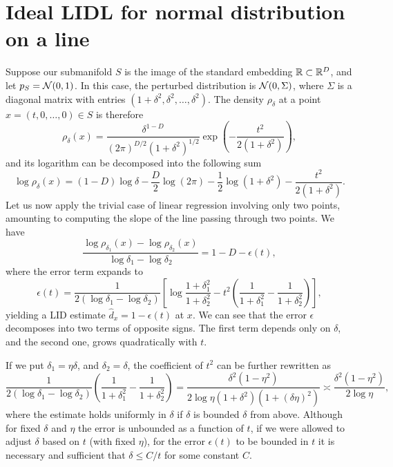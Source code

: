 \section{Ideal LIDL for normal distribution on a line}
\label{sec:appendix-lidl-for-normal-distribution}

Suppose our submanifold $S$ is the image of the standard embedding $\mathbb{R}\subset\mathbb{R}^D$, and let $p_S=\mathcal{N}(0,1)$. In this case, the perturbed distribution is $\mathcal{N}(0,\Sigma)$, where $\Sigma$ is a diagonal matrix with entries $(1+\delta^2, \delta^2, \dots, \delta^2)$. The density $\rho_\delta$ at a point $x=(t,0,\dots,0)\in S$ is therefore
\begin{equation}
    \rho_\delta(x) =  \frac{\delta^{1-D}}{(2\pi)^{D/2}(1+\delta^2)^{1/2}} \exp\left( -\frac{t^2}{2(1+\delta^2)}\right),
\end{equation}
and its logarithm can be decomposed into the following sum
\begin{equation}
    \log\rho_\delta(x) = 
        (1-D)\log\delta 
        - \frac{D}{2}\log(2\pi)
        - \frac{1}{2}\log(1+\delta^2)
        - \frac{t^2}{2(1+\delta^2)}.
\end{equation}
Let us now apply the trivial case of linear regression involving only two points, amounting to computing the slope of the line passing through two points. We have
\begin{equation}
    \frac{\log\rho_{\delta_1}(x) - \log\rho_{\delta_2}(x)}{\log\delta_1 - \log\delta_2} = 
        1 - D - \epsilon(t)
        ,
\end{equation}
where the error term expands to
\begin{equation}
    \epsilon(t)= \frac{1}{2(\log\delta_1 - \log\delta_2)}
            \left[ \log\frac{1+\delta_1^2}{1+\delta_2^2}
            - t^2 \left( \frac{1}{1+\delta_1^2} - \frac{1}{1+\delta_2^2} \right)\right],
\end{equation}
yielding a LID estimate $\hat{d}_x = 1 - \epsilon(t)$ at $x$.
We can see that the error $\epsilon$ decomposes into two terms of opposite signs. The first term depends only on $\delta$, and the second one, grows quadratically with $t$.

If we put $\delta_1=\eta\delta$, and $\delta_2=\delta$, the coefficient of $t^2$ can be further rewritten as
\begin{equation}
    \frac{1}{2(\log\delta_1 - \log\delta_2)} \left( \frac{1}{1+\delta_1^2} - \frac{1}{1+\delta_2^2} \right) 
    = \frac{\delta^2(1-\eta^2)}{2\log\eta(1+\delta^2)(1+(\delta\eta)^2)} \asymp \frac{\delta^2(1-\eta^2)}{2\log\eta},
\end{equation}
where the estimate holds uniformly in $\delta$ if $\delta$ is bounded $\delta$ from above. Although for fixed $\delta$ and $\eta$ the error is unbounded as a function of $t$, if we were allowed to adjust $\delta$ based on $t$ (with fixed $\eta$), for the error $\epsilon(t)$ to be bounded in $t$ it is necessary and sufficient that $\delta \leq C/t$ for some constant $C$.

